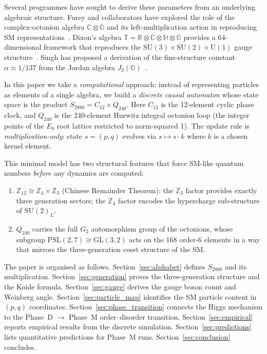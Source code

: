 \documentclass[11pt,a4paper]{article}
\theoremstyle{remark}
\begin{document}
Several programmes have sought to derive these parameters from an underlying algebraic
structure.  Furey and collaborators have explored the role of the complex-octonion algebra
$\mathbb{C} \otimes \mathbb{O}$ and its left-multiplication action in reproducing SM
representations~\cite{Furey2018,Furey2025}.
Dixon's algebra $\mathbb{T} = \mathbb{R} \otimes \mathbb{C} \otimes \mathbb{H} \otimes \mathbb{O}$
provides a 64-dimensional framework that reproduces the $\mathrm{SU}(3) \times \mathrm{SU}(2) \times \mathrm{U}(1)$
gauge structure~\cite{Dixon1994}.
Singh has proposed a derivation of the fine-structure constant $\alpha \approx 1/137$
from the Jordan algebra $J_3(\mathbb{O})$~\cite{Singh2021}.

In this paper we take a \emph{computational} approach: instead of representing particles
as elements of a single algebra, we build a \emph{discrete causal automaton} whose
state space is the product $S_{2880} = C_{12} \times Q_{240}$.  Here $C_{12}$ is the
12-element cyclic phase clock, and $Q_{240}$ is the 240-element Hurwitz integral
octonion loop (the integer points of the $E_8$ root lattice restricted to norm-squared 1).
The update rule is \emph{multiplication-only}: state $s = (p, q)$ evolves via
$s \mapsto s \cdot k$ where $k$ is a chosen kernel element.

This minimal model has two structural features that force SM-like quantum numbers
\emph{before} any dynamics are computed:
\begin{enumerate}
  \item $\mathbb{Z}_{12} \cong \mathbb{Z}_4 \times \mathbb{Z}_3$ (Chinese Remainder Theorem):
        the $\mathbb{Z}_3$ factor provides exactly three generation sectors;
        the $\mathbb{Z}_4$ factor encodes the hypercharge sub-structure of $\mathrm{SU}(2)_L$.
  \item $Q_{240}$ carries the full $G_2$ automorphism group of the octonions, whose
        subgroup $\mathrm{PSL}(2,7) \cong \mathrm{GL}(3,2)$ acts on the 168 order-6 elements
        in a way that mirrors the three-generation coset structure of the SM.
\end{enumerate}

The paper is organised as follows.
Section~\ref{sec:alphabet} defines $S_{2880}$ and its multiplication.
Section~\ref{sec:generation} proves the three-generation structure and the Koide formula.
Section~\ref{sec:gauge} derives the gauge boson count and Weinberg angle.
Section~\ref{sec:particle_map} identifies the SM particle content in $(p,q)$ coordinates.
Section~\ref{sec:phase_transition} connects the Higgs mechanism to the Phase~D $\to$ Phase~M
order--disorder transition.
Section~\ref{sec:empirical} reports empirical results from the discrete simulation.
Section~\ref{sec:predictions} lists quantitative predictions for Phase~M runs.
Section~\ref{sec:conclusion} concludes.
\end{document}
